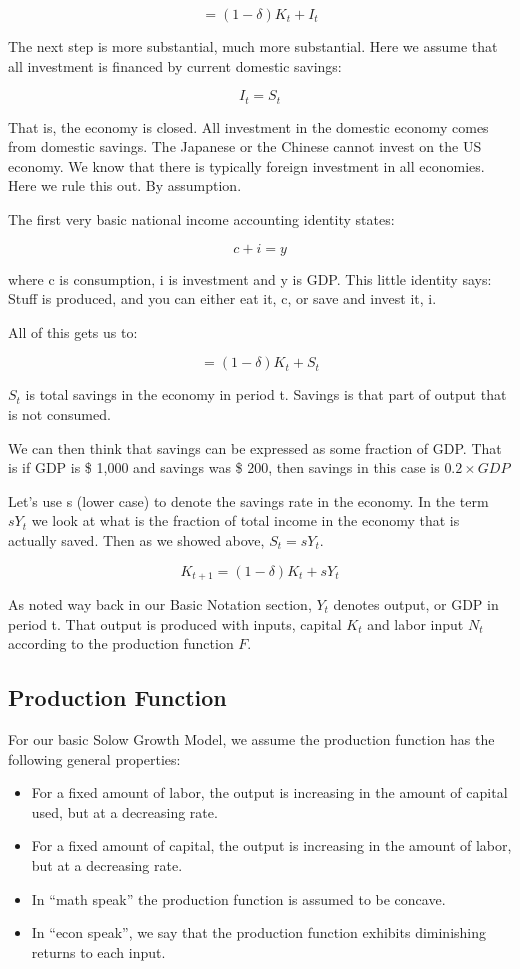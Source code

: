 \documentclass[
]{book}
\providecommand{\tightlist}{%
  \setlength{\itemsep}{0pt}\setlength{\parskip}{0pt}}
\begin{document}
\[=(1-\delta) K_t+I_t\]

The next step is more substantial, much more substantial. Here we assume that all investment is financed by current domestic savings:

\[I_t=S_t\]

That is, the economy is closed. All investment in the domestic economy comes from domestic savings. The Japanese or the Chinese cannot invest on the US economy. We know that there is typically foreign investment in all economies. Here we rule this out. By assumption.

The first very basic national income accounting identity states:

\[c + i = y\]

where c is consumption, i is investment and y is GDP. This little identity says: Stuff is produced, and you can either eat it, c, or save and invest it, i.

All of this gets us to:

\[=(1-\delta)K_t+S_t\]

\(S_t\) is total savings in the economy in period t. Savings is that part of output that is not consumed.

We can then think that savings can be expressed as some fraction of GDP. That is if GDP is \$ 1,000 and savings was \$ 200, then savings in this case is \(0.2 \times GDP\)

Let's use s (lower case) to denote the savings rate in the economy. In the term \(sY_t\) we look at what is the fraction of total income in the economy that is actually saved. Then as we showed above, \(S_t=sY_t\).

\[K_{t+1}=(1-\delta) K_t+sY_t\]

As noted way back in our Basic Notation section, \(Y_t\) denotes output, or GDP in period t. That output is produced with inputs, capital \(K_t\) and labor input \(N_t\) according to the production function \(F\).

\hypertarget{production-function}{%
\subsection{Production Function}\label{production-function}}

For our basic Solow Growth Model, we assume the production function has the following general properties:

\begin{itemize}
\tightlist
\item
  For a fixed amount of labor, the output is increasing in the amount of capital used, but at a decreasing rate.
\item
  For a fixed amount of capital, the output is increasing in the amount of labor, but at a decreasing rate.
\item
  In ``math speak'' the production function is assumed to be concave.
\item
  In ``econ speak'', we say that the production function exhibits diminishing returns to each input.
\end{itemize}
\end{document}
